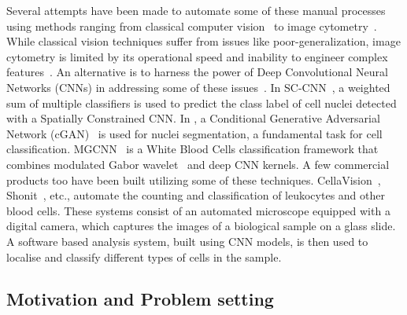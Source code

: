 \documentclass[journal,twoside,web]{IEEEtran}
\begin{document}
Several attempts have been made to automate some of these manual processes using methods ranging from classical computer vision~\cite{lee2013performance,young1972classification,bikhet2000segmentation} to image cytometry~\cite{hagwood2011evaluation, lippeveld2019classification}. While classical vision techniques suffer from issues like poor-generalization, image cytometry is limited by its operational speed and inability to engineer complex features~\cite{chen2016deep}. 
An alternative is to harness the power of Deep Convolutional Neural Networks (CNNs) in addressing some of these issues~\cite{qin2018fine}. In SC-CNN~\cite{sirinukunwattana2016locality}, a weighted sum of multiple classifiers is used to predict the class label of cell nuclei detected with a Spatially Constrained CNN. In \cite{mahmood2019deep}, a Conditional Generative Adversarial Network (cGAN)~\cite{mirza2014conditional} is used for nuclei segmentation, a fundamental task for cell classification. MGCNN~\cite{huang2019blood} is a White Blood Cells classification framework that combines modulated Gabor wavelet~\cite{lee1996image} and deep CNN kernels. A few commercial products too have been built utilizing some of these techniques. CellaVision~\cite{cellavision}, Shonit~\cite{shonit}, etc., automate the counting and classification of leukocytes and other blood cells. These systems consist of an automated microscope equipped with a digital camera, which captures the images of a biological sample on a glass slide. A software based analysis system, built using CNN models, is then used to localise and classify different types of cells in the sample.

\subsection{Motivation and Problem setting}
\end{document}
